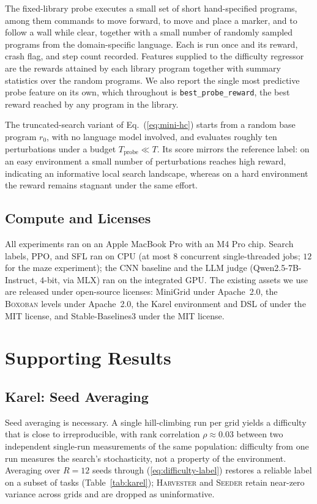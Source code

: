 \documentclass[twoside]{article}
\begin{document}
The fixed-library probe executes a small set of short hand-specified programs, among them commands to move forward, to move and place a marker, and to follow a wall while clear, together with a small number of randomly sampled programs from the domain-specific language. Each is run once and its reward, crash flag, and step count recorded. Features supplied to the difficulty regressor are the rewards attained by each library program together with summary statistics over the random programs. We also report the single most predictive probe feature on its own, which throughout is \texttt{best\_probe\_reward}, the best reward reached by any program in the library.

The truncated-search variant of Eq.~(\ref{eq:mini-hc}) starts from a random base program $r_0$, with no language model involved, and evaluates roughly ten perturbations under a budget $T_{\mathrm{probe}} \ll T$. Its score mirrors the reference label: on an easy environment a small number of perturbations reaches high reward, indicating an informative local search landscape, whereas on a hard environment the reward remains stagnant under the same effort.

\subsection{Compute and Licenses}
\label{app:compute}
All experiments ran on an Apple MacBook Pro with an M4 Pro chip. Search labels, PPO, and SFL ran on CPU (at most $8$ concurrent single-threaded jobs; $12$ for the maze experiment); the CNN baseline and the LLM judge (Qwen2.5-7B-Instruct, $4$-bit, via MLX) ran on the integrated GPU. The existing assets we use are released under open-source licenses: MiniGrid \citep{chevalierboisvert2018minigrid} under Apache~2.0, the \textsc{Boxoban} levels \citep{guez2019investigation} under Apache~2.0, the Karel environment and DSL of \citet{trivedi2021learning} under the MIT license, and Stable-Baselines3 \citep{raffin2021stable} under the MIT license.

\section{Supporting Results}
\label{app:extra}

\subsection{Karel: Seed Averaging}
\label{app:seedavg}
Seed averaging is necessary. A single hill-climbing run per grid yields a difficulty that is close to irreproducible, with rank correlation $\rho \approx 0.03$ between two independent single-run measurements of the same population: difficulty from one run measures the search's stochasticity, not a property of the environment. Averaging over $R=12$ seeds through (\ref{eq:difficulty-label}) restores a reliable label on a subset of tasks (Table~\ref{tab:karel}); \textsc{Harvester} and \textsc{Seeder} retain near-zero variance across grids and are dropped as uninformative.
\end{document}
